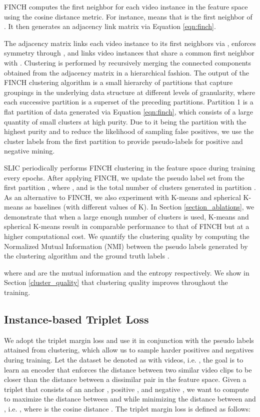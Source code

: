 \documentclass[10pt,twocolumn,letterpaper]{article}
\begin{document}
FINCH computes the first neighbor  for each video instance  in the feature space using the cosine distance metric. For instance,  means that  is the first neighbor of . It then generates an adjacency link matrix  via Equation \ref{eqn:finch}.


The adjacency matrix links each video instance  to its first neighbors via , enforces symmetry through , and links video instances that share a common first neighbor with . Clustering is performed by recursively merging the connected components obtained from the adjacency matrix  in a hierarchical fashion. The output of the FINCH clustering algorithm is a small hierarchy of partitions that capture groupings in the underlying data structure at different levels of granularity, where each successive partition is a superset of the preceding partitions. Partition 1 is a flat partition of data generated via Equation \ref{eqn:finch}, which consists of a large quantity of small clusters at high purity. Due to it being the partition with the highest purity and to reduce the likelihood of sampling false positives, we use the cluster labels from the first partition to provide pseudo-labels for positive and negative mining.      

SLIC periodically performs FINCH clustering in the feature space during training every  epochs. After applying FINCH, we update the pseudo label set  from the first partition , where , and  is the total number of clusters generated in partition . As an alternative to FINCH, we also experiment with K-means and spherical K-means as baselines (with different values of K). In Section \ref{section_ablations}, we demonstrate that when a large enough number of clusters is used, K-means and spherical K-means result in comparable performance to that of FINCH but at a higher computational cost. We quantify the clustering quality by computing the Normalized Mutual Information (NMI) between the pseudo labels generated by the clustering algorithm  and the ground truth labels . 
\vspace*{-0.15cm}

where  and  are the mutual information and the entropy respectively. We show in Section \ref{cluster_quality} that clustering quality improves throughout the training. 

\subsection{Instance-based Triplet Loss}
\vspace{-0.1cm}
We adopt the triplet margin loss and use it in conjunction with the pseudo labels attained from clustering, which allow us to sample harder positives and negatives during training.
Let the dataset be denoted as  with  videos, i.e. , the goal is to learn an encoder  that enforces the distance between two similar video clips to be closer than the distance between a dissimilar pair in the feature space.
Given a triplet that consists of an anchor , positive , and negative , we want to compute  to maximize the distance between  and  while minimizing the distance between  and , i.e. , where  is the cosine distance . The triplet margin loss is defined as follows:
\vspace{-0.1cm}
\end{document}
